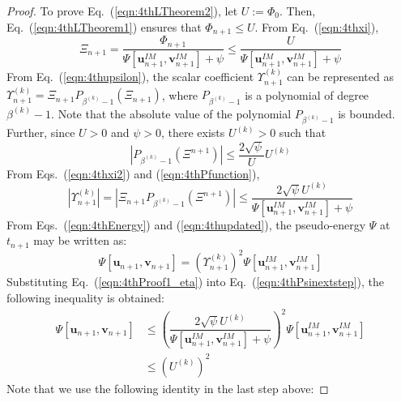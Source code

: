 \documentclass[review]{elsarticle}
\begin{document}
\begin{proof}
  To prove Eq.~(\ref{eqn:4thLTheorem2}), let $U:=\Phi_0$.
  Then, Eq.~(\ref{eqn:4thLTheorem1}) ensures that $\Phi_{n+1} \le U$.
  From Eq.~(\ref{eqn:4thxi}),
  \begin{equation}
      \Xi_{n+1} = \dfrac{\Phi_{n+1}}{\Psi[\boldsymbol{u}_{n+1}^{IM},\boldsymbol{v}_{n+1}^{IM}]+\psi} \le \dfrac{U}{\Psi[\boldsymbol{u}_{n+1}^{IM},\boldsymbol{v}_{n+1}^{IM}]+\psi}
      \label{eqn:4thxi2}
  \end{equation}  
  From Eq.~(\ref{eqn:4thupsilon}), the scalar coefficient $\Upsilon^{(k)}_{n+1}$ can be represented as $\Upsilon^{(k)}_{n+1}=\Xi_{n+1} P_{\beta^{(k)}-1}(\Xi_{n+1})$, where $P_{\beta^{(k)}-1}$ is a polynomial of degree $\beta^{(k)}-1$.
  Note that the absolute value of the polynomial $P_{\beta^{(k)}-1}$ is bounded. 
  Further, since $U>0$ and $\psi>0$, there exists $U^{(k)}>0$ such that 
  \begin{equation}
      |P_{\beta^{(k)}-1}(\Xi^{n+1})| \le \dfrac{2\sqrt{\psi}}{U}U^{(k)}
      \label{eqn:4thPfunction}
  \end{equation} 
  From Eqs.~(\ref{eqn:4thxi2}) and (\ref{eqn:4thPfunction}), 
  \begin{equation}
      |\Upsilon^{(k)}_{n+1}|=|\Xi_{n+1} P_{\beta^{(k)}-1}(\Xi^{n+1})|\le \dfrac{2\sqrt{\psi}U^{(k)}}{\Psi[\boldsymbol{u}_{n+1}^{IM},\boldsymbol{v}_{n+1}^{IM}]+\psi}
      \label{eqn:4thProof1_eta}
  \end{equation}  
  From Eqs.~(\ref{eqn:4thEnergy}) and (\ref{eqn:4thupdated}), the pseudo-energy $\Psi$ at $t_{n+1}$ may be written as:
  \begin{equation}
       \Psi[\boldsymbol{u}_{n+1},\boldsymbol{v}_{n+1}] = \left(\Upsilon^{(k)}_{n+1}\right)^2 \Psi[\boldsymbol{u}_{n+1}^{IM},\boldsymbol{v}_{n+1}^{IM}] 
       \label{eqn:4thPsinextstep}
  \end{equation}
  Substituting Eq.~(\ref{eqn:4thProof1_eta}) into Eq.~(\ref{eqn:4thPsinextstep}), the following inequality is obtained:
  \begin{equation}
      \begin{array}{ll}
           \Psi[\boldsymbol{u}_{n+1},\boldsymbol{v}_{n+1}] 
           &\le \left(\dfrac{2\sqrt{\psi}U^{(k)}}{\Psi[\boldsymbol{u}_{n+1}^{IM},\boldsymbol{v}_{n+1}^{IM}]+\psi}\right)^2 \Psi[\boldsymbol{u}_{n+1}^{IM},\boldsymbol{v}_{n+1}^{IM}] \\
           &\le \left(U^{(k)}\right)^2
      \end{array}        
  \end{equation}
    Note that we use the following identity in the last step above:

\end{proof}
\end{document}
